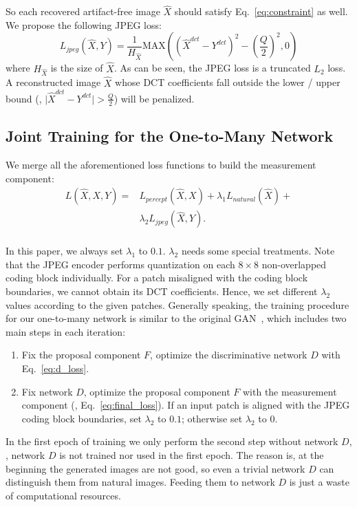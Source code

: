 \documentclass[10pt,twocolumn,letterpaper]{article}
\begin{document}
So each recovered artifact-free image $\hat{X}$ should satisfy Eq.~\eqref{eq:constraint} as well. We propose the following JPEG loss:
\begin{equation}
L_{jpeg}(\hat{X}, Y) = \frac{1}{H_{\hat{X}}}\text{MAX}\left(\left(\hat{X}^{dct} - Y^{dct}\right)^2 - \left(\frac{Q}{2}\right)^2, 0\right)
\end{equation}
where $H_{\hat{X}}$ is the size of $\hat{X}$. As can be seen, the JPEG loss is a truncated $L_2$ loss. A reconstructed image $\hat{X}$ whose DCT coefficients fall outside the lower / upper bound (\ie, $\lvert\hat{X}^{dct} - Y^{dct}\rvert > \frac{Q}{2}$) will be penalized.

\subsection{Joint Training for the One-to-Many Network}
\label{sec:joint_training}
We merge all the aforementioned loss functions to build the measurement component:
\begin{equation}
\begin{split}
L(\hat{X}, X, Y) = &L_{percept}(\hat{X}, X) + \lambda_1 L_{natural}(\hat{X}) +\\
&\lambda_2 L_{jpeg}(\hat{X}, Y).\\
\end{split}
\label{eq:final_loss}
\end{equation}

In this paper, we always set $\lambda_1$ to $0.1$. $\lambda_2$ needs some special treatments. Note that the JPEG encoder performs quantization on each $8 \times 8$ non-overlapped coding block individually. For a patch misaligned with the coding block boundaries, we cannot obtain its DCT coefficients. Hence, we set different $\lambda_2$ values according to the given patches. Generally speaking, the training procedure for our one-to-many network is similar to the original GAN~\cite{gan}, which includes two main steps in each iteration:
\begin{enumerate}
\item Fix the proposal component $F$, optimize the discriminative network $D$ with Eq.~\eqref{eq:d_loss}.
\item Fix network $D$, optimize the proposal component $F$ with the measurement component (\ie, Eq.~\eqref{eq:final_loss}). If an input patch is aligned with the JPEG coding block boundaries, set $\lambda_2$ to $0.1$; otherwise set $\lambda_2$ to $0$.
\end{enumerate}
In the first epoch of training we only perform the second step without network $D$, \ie, network $D$ is not trained nor used in the first epoch. The reason is, at the beginning the generated images are not good, so even a trivial network $D$ can distinguish them from natural images. Feeding them to network $D$ is just a waste of computational resources.
\end{document}
